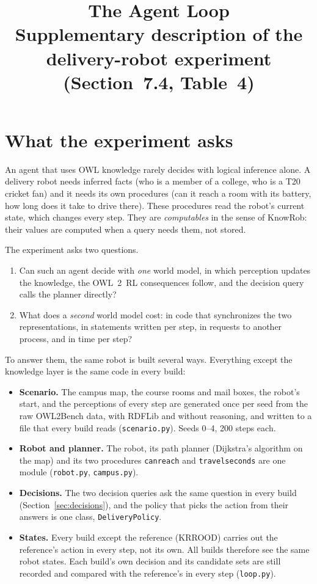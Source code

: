 \documentclass[10pt]{article}
\title{\textbf{The Agent Loop}\\[2pt]\large Supplementary description of the delivery-robot experiment (Section~7.4, Table~4)}
\date{}
\author{}
\newcommand{\brkunderscore}{\textunderscore\allowbreak}
\newcommand{\code}[1]{{\let\_\brkunderscore\texttt{#1}}}
\newcommand{\file}[1]{{\let\_\brkunderscore\texttt{#1}}}
\begin{document}
\maketitle
\vspace{-3em}

\tableofcontents

\section{What the experiment asks}
\label{sec:question}

An agent that uses OWL knowledge rarely decides with logical inference alone. A delivery robot needs inferred facts
(who is a member of a college, who is a T20 cricket fan) and it needs its own procedures (can it reach a room with its
battery, how long does it take to drive there). These procedures read the robot's current state, which changes every
step. They are \emph{computables} in the sense of KnowRob: their values are computed when a query needs them, not
stored.

The experiment asks two questions.
\begin{enumerate}
  \item Can such an agent decide with \emph{one} world model, in which perception updates the knowledge, the OWL~2~RL
        consequences follow, and the decision query calls the planner directly?
  \item What does a \emph{second} world model cost: in code that synchronizes the two representations, in
        statements written per step, in requests to another process, and in time per step?
\end{enumerate}

To answer them, the same robot is built several ways. Everything except the knowledge layer is the same code in every
build:
\begin{itemize}
  \item \textbf{Scenario.} The campus map, the course rooms and mail boxes, the robot's start, and the perceptions of
        every step are generated once per seed from the raw OWL2Bench data, with RDFLib and without reasoning, and
        written to a file that every build reads (\file{scenario.py}). Seeds 0--4, 200 steps each.
  \item \textbf{Robot and planner.} The robot, its path planner (Dijkstra's algorithm on the map) and its two
        procedures \code{can\_reach} and \code{travel\_seconds} are one module (\file{robot.py}, \file{campus.py}).
  \item \textbf{Decisions.} The two decision queries ask the same question in every build (Section~\ref{sec:decisions}),
        and the policy that picks the action from their answers is one class, \code{DeliveryPolicy}.
  \item \textbf{States.} Every build except the reference (KRROOD) carries out the reference's action in every step,
        not its own. All builds therefore see the same robot states. Each build's own decision and its candidate sets
        are still recorded and compared with the reference's in every step (\file{loop.py}).
\end{itemize}
\end{document}
